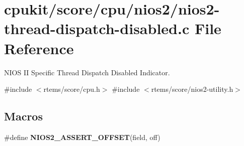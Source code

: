\hypertarget{nios2-thread-dispatch-disabled_8c}{}\section{cpukit/score/cpu/nios2/nios2-\/thread-\/dispatch-\/disabled.c File Reference}
\label{nios2-thread-dispatch-disabled_8c}


N\+I\+OS II Specific Thread Dispatch Disabled Indicator.  


{\ttfamily \#include $<$rtems/score/cpu.\+h$>$}\newline
{\ttfamily \#include $<$rtems/score/nios2-\/utility.\+h$>$}\newline
\subsection*{Macros}
\begin{DoxyCompactItemize}
\item 
\#define {\bfseries N\+I\+O\+S2\+\_\+\+A\+S\+S\+E\+R\+T\+\_\+\+O\+F\+F\+S\+ET}(field,  off)
\end{DoxyCompactItemize}
